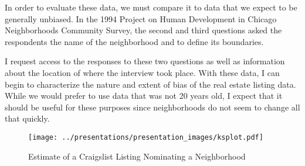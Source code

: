 \documentclass[11pt,letterpaper,oneside]{article}
\begin{document}
In order to evaluate these data, we must compare it to data that we
expect to be generally unbiased. In the 1994 Project on Human
Development in Chicago Neighborhoods Community Survey, the second and
third questions asked the respondents the name of the neighborhood and
to define its boundaries.

I request access to the responses to these two questions as well as
information about the location of where the interview took place. With
these data, I can begin to characterize the nature and extent of bias
of the real estate listing data. While we would prefer to use data
that was not 20 years old, I expect that it should be useful for these
purposes since neighborhoods do not seem to change all that quickly.

\begin{figure}
\centering
\texttt{[image: ../presentations/presentation\_images/ksplot.pdf]}
\caption{Estimate of a Craigslist Listing Nominating a Neighborhood}
\end{figure}
\end{document}
